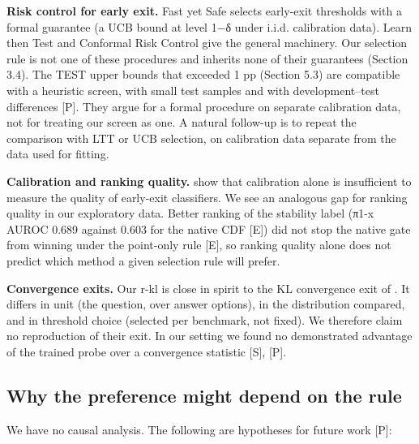\textbf{Risk control for early exit.} Fast yet Safe \citep{Jazbec2024} selects early-exit thresholds with a formal guarantee (a UCB bound at level 1−δ under
i.i.d. calibration data). Learn then Test \citep{Angelopoulos2025LTT} and Conformal Risk Control \citep{Angelopoulos2024CRC} give the general machinery. Our
selection rule is not one of these procedures and inherits none of their guarantees (Section 3.4). The TEST upper bounds that exceeded 1 pp
(Section 5.3) are compatible with a heuristic screen, with small test samples and with development--test differences {[}P{]}. They argue for a
formal procedure on separate calibration data, not for treating our screen as one. A natural follow-up is to repeat the comparison with LTT or UCB selection, on calibration data separate from the data used for fitting.

\textbf{Calibration and ranking quality.} \citet{Kubaty2026} show that calibration alone is insufficient to measure the quality of early-exit classifiers. We see an analogous gap
for ranking quality in our exploratory data. Better ranking of the stability label (π1-x AUROC 0.689 against 0.603 for the native CDF {[}E{]}) did not stop
the native gate from winning under the point-only rule {[}E{]}, so ranking quality alone does not predict which method a given selection rule will prefer.

\textbf{Convergence exits.} Our r-kl is close in spirit to the KL convergence exit of \citet{Geiping2025}. It differs in unit (the question,
over answer options), in the distribution compared, and in threshold choice (selected per benchmark, not fixed). We therefore claim no
reproduction of their exit. In our setting we found no demonstrated advantage of the trained probe over a convergence statistic {[}S{]}, {[}P{]}.

\subsection{Why the preference might depend on the rule}

We have no causal analysis. The following are hypotheses for future work {[}P{]}:

